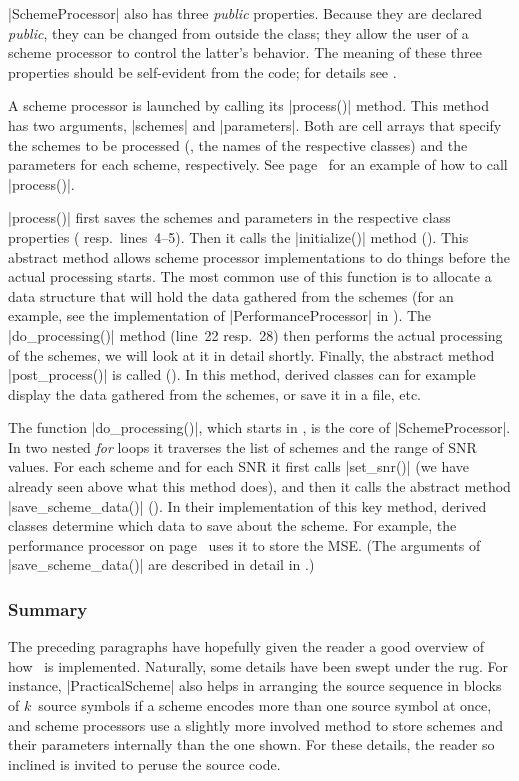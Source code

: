 |SchemeProcessor| also has three \emph{public} properties. Because they are
declared \emph{public}, they can be changed from outside the class; they allow
the user of a scheme processor to control the latter's behavior. The meaning of
these three properties should be self-evident from the code; for details see
.

A scheme processor is launched by calling its |process()| method. This method
has two arguments, |schemes| and |parameters|. Both are cell arrays that
specify the schemes to be processed (\ie, the names of the respective classes)
and the parameters for each scheme, respectively. See
page~\pageref{sec:perfanalysis} for an example of how to call |process()|.

|process()| first saves the schemes and parameters in the respective class
properties ( resp.~lines~4--5). Then it calls the |initialize()|
method (). This abstract method allows scheme processor
implementations to do things before the actual processing starts. The most
common use of this function is to allocate a data structure that will hold the
data gathered from the schemes (for an example, see the implementation of
|PerformanceProcessor| in ).  The |do_processing()| method
(line~22 resp.~28) then performs the actual processing of the schemes, we will
look at it in detail shortly. Finally, the abstract method |post_process()| is
called (). In this method, derived classes can for example display
the data gathered from the schemes, or save it in a file, etc.

The function |do_processing()|, which starts in , is the core of
|SchemeProcessor|. In two nested \emph{for} loops it traverses the list of
schemes and the range of SNR values. For each scheme and for each SNR it first
calls |set_snr()| (we have already seen above what this method does), and then
it calls the abstract method |save_scheme_data()| (). In their
implementation of this key method, derived classes determine which data to save
about the scheme. For example, the performance processor on
page~\pageref{sec:perfanalysis} uses it to store the MSE. (The arguments of
|save_scheme_data()| are described in detail in .)


\subsubsection{Summary}

The preceding paragraphs have hopefully given the reader a good overview of how
\jscsim\ is implemented. Naturally, some details have been swept under the rug.
For instance, |PracticalScheme| also helps in arranging the source sequence in
blocks of $k$~source symbols if a scheme encodes more than one source symbol at
once, and scheme processors use a slightly more involved method to store schemes
and their parameters internally than the one shown. For these details, the
reader so inclined is invited to peruse the source code.


